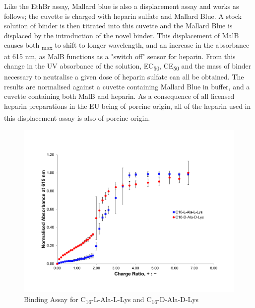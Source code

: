 Like the EthBr assay, Mallard blue is also a displacement assay and works as follows; the cuvette is charged with heparin sulfate and Mallard Blue. A stock solution of binder is then titrated into this cuvette and the Mallard Blue is displaced by the introduction of the novel binder. This displacement of MalB causes both \textlambda \textsubscript{max} to shift to longer wavelength, and an increase in the absorbance at 615 nm, as MalB functions as a "switch off" sensor for heparin.  From this change in the UV absorbance of the solution, EC\textsubscript{50}, CE\textsubscript{50} and the mass of binder necessary to neutralise a given dose of heparin sulfate can all be obtained. The results are normalised against a cuvette containing Mallard Blue in buffer, and a cuvette containing both MalB and heparin.
As a consequence of all licensed heparin preparations in the EU being of porcine origin, all of the heparin used in this displacement assay is also of porcine origin.\textsuperscript{\cite{Mulloy2015PharmacologyDrugs}}
\newpage
\begin{figure} [h!]
\centering
\includegraphics[scale=0.42]{Mallard_Blue/Homochiral_pair_-_MalB.pdf}
\caption{Binding Assay for C\textsubscript{16}-L-Ala-L-Lys and C\textsubscript{16}-D-Ala-D-Lys}
\label{homochiral_pair}
\end{figure}
